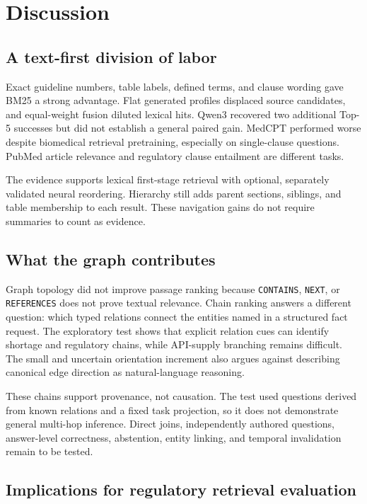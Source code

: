 \section{Discussion}
\label{sec:discussion}

\subsection{A text-first division of labor}

Exact guideline numbers, table labels, defined terms, and clause wording gave BM25 a strong advantage. Flat generated profiles displaced source candidates, and equal-weight fusion diluted lexical hits. Qwen3 recovered two additional Top-5 successes but did not establish a general paired gain. MedCPT performed worse despite biomedical retrieval pretraining, especially on single-clause questions. PubMed article relevance and regulatory clause entailment are different tasks.

The evidence supports lexical first-stage retrieval with optional, separately validated neural reordering. Hierarchy still adds parent sections, siblings, and table membership to each result. These navigation gains do not require summaries to count as evidence.

\subsection{What the graph contributes}

Graph topology did not improve passage ranking because \texttt{CONTAINS}, \texttt{NEXT}, or \texttt{REFERENCES} does not prove textual relevance. Chain ranking answers a different question: which typed relations connect the entities named in a structured fact request. The exploratory test shows that explicit relation cues can identify shortage and regulatory chains, while API-supply branching remains difficult. The small and uncertain orientation increment also argues against describing canonical edge direction as natural-language reasoning.

These chains support provenance, not causation. The test used questions derived from known relations and a fixed task projection, so it does not demonstrate general multi-hop inference. Direct joins, independently authored questions, answer-level correctness, abstention, entity linking, and temporal invalidation remain to be tested.

\subsection{Implications for regulatory retrieval evaluation}

